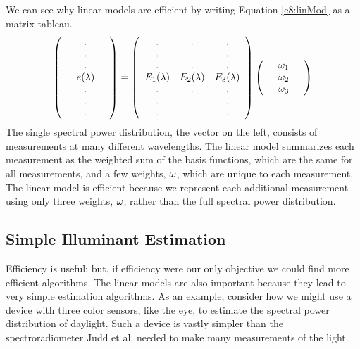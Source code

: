 We can see why linear models are efficient by writing Equation
\ref{e8:linMod} as a matrix tableau.
\begin{equation}
\left (
 \begin{array}{ccc}
    & . & \\
    & . & \\
    & . & \\
   & e(\lambda) & \\
    & . & \\
    & . & \\
    & . & \\
 \end{array} \right ) =
\left (
 \begin{array}{ccc}
    .   & . & . \\
    .   & . & . \\
    .   & . & . \\
   \mbox{$E_{1}(\lambda)$} & \mbox{$E_{2}(\lambda)$} & \mbox{$E_{3}(\lambda)$} \\
    .   & . & . \\
    .   & . & . \\
    .   & . & . \\
 \end{array}
\right )
\left (
 \begin{array}{ccc}
   & \mbox{$\omega_{1}$} & \\
   & \mbox{$\omega_{2}$} & \\
   & \mbox{$\omega_{3}$} & \\
 \end{array}
\right ) \nonumber
\end{equation}
The single spectral power distribution, the vector on the left,
consists of measurements at many different wavelengths.  The linear
model summarizes each measurement as the weighted sum of the basis
functions, which are the same for all measurements, and a few weights,
$\mbox{${\bf \omega}$}$, which are unique to each measurement.  The linear model is
efficient because we represent each additional measurement using
only three weights, $\mbox{${\bf \omega}$}$, rather than the full spectral power
distribution. 

\subsection*{Simple Illuminant Estimation}
Efficiency is useful; but, if efficiency were our only objective we
could find more efficient algorithms.  The linear models are also
important because they lead to very simple estimation algorithms.  As
an example, consider how we might use a device with three color
sensors, like the eye, to estimate the spectral power distribution of
daylight.  Such a device is vastly simpler than the spectroradiometer
Judd et al. needed to make many measurements of the light.

